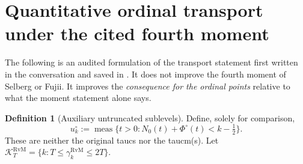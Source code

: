 \documentclass[11pt,a4paper]{article}
\numberwithin{equation}{section}
\theoremstyle{definition}
\newtheorem{definition}[theorem]{Definition}
\theoremstyle{remark}
\newcommand{\meas}{\operatorname{meas}}
\begin{document}
\section{Quantitative ordinal transport under the cited fourth moment}
\label{sec:v7-transport}
The following is an audited formulation of the transport statement
first written in the conversation and saved in
\cite{CasanaV10Transport}. It does not improve the fourth moment
of Selberg or Fujii. It improves the \emph{consequence for the
ordinal points} relative to what the moment statement alone says.

\begin{definition}[Auxiliary untruncated sublevels]
\label{def:v7-untruncated}
Define, solely for comparison,
\begin{equation}\label{eq:v7-untruncated}
 u_k^\circ:=\meas\{t>0:N_0(t)+\Phi^\circ(t)<k-\tfrac12\}.
\end{equation}
These are neither the original taucs nor the taucm(s). Let
$\mathcal K_T^{\mathrm{RvM}}=\{k:T\le\gamma_k^{\mathrm{RvM}}\le2T\}$.
\end{definition}
\end{document}
